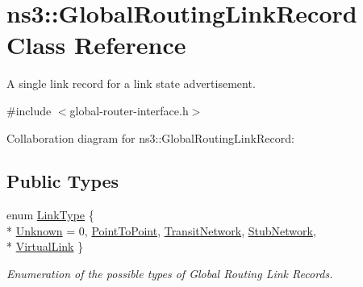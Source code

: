 \hypertarget{classns3_1_1GlobalRoutingLinkRecord}{}\section{ns3\+:\+:Global\+Routing\+Link\+Record Class Reference}
\label{classns3_1_1GlobalRoutingLinkRecord}


A single link record for a link state advertisement.  




{\ttfamily \#include $<$global-\/router-\/interface.\+h$>$}



Collaboration diagram for ns3\+:\+:Global\+Routing\+Link\+Record\+:
\subsection*{Public Types}
\begin{DoxyCompactItemize}
\item 
enum \hyperlink{classns3_1_1GlobalRoutingLinkRecord_a9380bcce9bca03943c4761b166a694f4}{Link\+Type} \{ \\*
\hyperlink{classns3_1_1GlobalRoutingLinkRecord_a9380bcce9bca03943c4761b166a694f4a3cfc0ca022914d0739a9077d6635aff0}{Unknown} = 0, 
\hyperlink{classns3_1_1GlobalRoutingLinkRecord_a9380bcce9bca03943c4761b166a694f4aa345c79cdcaba957f5e8296509183912}{Point\+To\+Point}, 
\hyperlink{classns3_1_1GlobalRoutingLinkRecord_a9380bcce9bca03943c4761b166a694f4ad3d00014c9ba50539a53b55fce117856}{Transit\+Network}, 
\hyperlink{classns3_1_1GlobalRoutingLinkRecord_a9380bcce9bca03943c4761b166a694f4a183ff8c880e05253fdca7bece2cad90b}{Stub\+Network}, 
\\*
\hyperlink{classns3_1_1GlobalRoutingLinkRecord_a9380bcce9bca03943c4761b166a694f4a0a02834608b2cb9dfb59f7d2949a0b17}{Virtual\+Link}
 \}\begin{DoxyCompactList}\small\item\em Enumeration of the possible types of Global Routing Link Records. \end{DoxyCompactList}
\end{DoxyCompactItemize}
